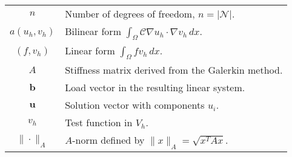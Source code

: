 \begin{longtable}{c p{10cm}}
    $n$                    & Number of degrees of freedom, $n = |\mathcal{N}|$.                                      \\
    $a(u_h, v_h)$          & Bilinear form $\int_\Omega \mathcal{C}\nabla u_h\cdot\nabla v_h\,dx$.                   \\
    $(f, v_h)$             & Linear form $\int_\Omega f v_h \,dx$.                                                   \\
    $A$                    & Stiffness matrix derived from the Galerkin method.                                      \\
    $\mathbf{b}$           & Load vector in the resulting linear system.                                             \\
    $\mathbf{u}$           & Solution vector with components $u_i$.                                                  \\
    $v_h$                  & Test function in $V_h$.                                                                 \\
    $\|\cdot\|_A$          & $A$-norm defined by $\|x\|_A = \sqrt{x^T A x}$.                                         \\
\end{longtable}

